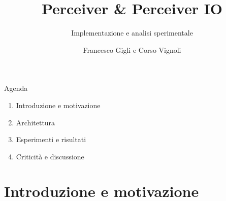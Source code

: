 \documentclass[aspectratio=169,10pt]{beamer}
\title[Perceiver \& Perceiver IO]{Perceiver \& Perceiver IO}
\subtitle{Implementazione e analisi sperimentale}
\author[F.Gigli C.Vignoli]{Francesco Gigli e Corso Vignoli}
\institute[UNIFI]{Università degli Studi di Firenze\\Corso B031278 -- Deep Learning}
\date{}
\begin{document}
\begin{frame}
  \titlepage
\end{frame}

\begin{frame}{Agenda}
  \begin{enumerate}
    \item Introduzione e motivazione
    \item Architettura
    \item Esperimenti e risultati
    \item Criticità e discussione
  \end{enumerate}
\end{frame}

\section{Introduzione e motivazione}
\end{document}
